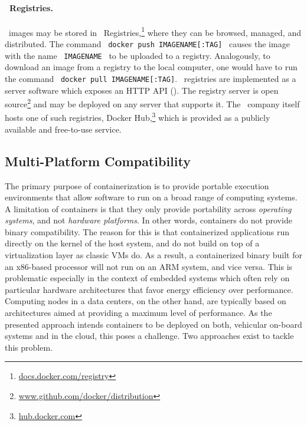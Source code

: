 \paragraph{\docker\ Registries.}
\docker\ images may be stored in \docker\ Registries,\footnote{\url{docs.docker.com/registry}} where they can be browsed, managed, and distributed. The command \ \mbox{\texttt{docker push IMAGENAME[:TAG]}} \ causes the image with the name \ \mbox{\texttt{IMAGENAME}} \ to be uploaded to a registry. Analogously, to download an image from a registry to the local computer, one would have to run the command \ \mbox{\texttt{docker pull IMAGENAME[:TAG]}}. \docker\ registries are implemented as a server software which exposes an HTTP API (\cf {}). The registry server is open source\footnote{\url{www.github.com/docker/distribution}} and may be deployed on any server that supports it. The \docker\ company itself hosts one of such registries, Docker Hub,\footnote{\url{hub.docker.com}} which is provided as a publicly available  and free-to-use service.

\subsection{Multi-Platform Compatibility} \label{sec:multiplat}
The primary purpose of containerization is to provide portable execution environments that allow software to run on a broad range of computing systems. A limitation of containers is that they only provide portability across \emph{operating systems}, and not \emph{hardware platforms}. In other words, containers do not provide binary compatibility. The reason for this is that containerized applications run directly on the kernel of the host system, and do not build on top of a virtualization layer as classic VMs do. As a result, a containerized binary built for an x86-based processor will not run on an ARM system, and vice versa. This is problematic especially in the context of embedded systems which often rely on particular hardware architectures that favor energy efficiency over performance. Computing nodes in a data centers, on the other hand, are typically based on architectures aimed at providing a maximum level of performance. As the presented approach intends containers to be deployed on both, vehicular on-board systems and in the cloud, this poses a challenge. Two approaches exist to tackle this problem.

